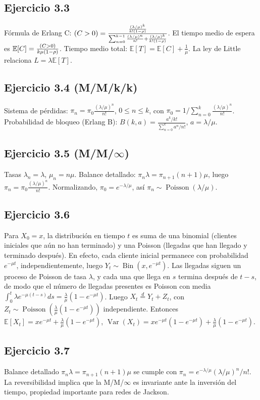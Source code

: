 \documentclass[12pt]{article}
\let\P\relax
\newcommand{\P}{\mathbb{P}}
\newcommand{\E}{\mathbb{E}}
\newcommand{\1}{\mathbf{1}}
\newcommand{\Var}{\operatorname{Var}}
\newcommand{\Bin}{\operatorname{Bin}}
\newcommand{\Poisson}{\operatorname{Poisson}}
\begin{document}
\subsection{Ejercicio 3.3}
F\'ormula de Erlang C: $\P(C>0)=\frac{\frac{(\lambda/\mu)^k}{k!(1-\rho)}}{\sum_{n=0}^{k-1}\frac{(\lambda/\mu)^n}{n!}+\frac{(\lambda/\mu)^k}{k!(1-\rho)}}$. El tiempo medio de espera es $\E[C]=\frac{\P(C>0)}{k\mu(1-\rho)}$. Tiempo medio total: $\E[T]=\E[C]+\frac1\mu$. La ley de Little relaciona $L=\lambda\E[T]$.

\subsection{Ejercicio 3.4 (M/M/k/k)}
Sistema de p\'erdidas: $\pi_n=\pi_0\frac{(\lambda/\mu)^n}{n!}$, $0\le n\le k$, con $\pi_0=1/\sum_{n=0}^k\frac{(\lambda/\mu)^n}{n!}$. Probabilidad de bloqueo (Erlang B): $B(k,a)=\frac{a^k/k!}{\sum_{n=0}^k a^n/n!}$, $a=\lambda/\mu$.

\subsection{Ejercicio 3.5 (M/M/$\infty$)}
Tasas $\lambda_n=\lambda$, $\mu_n=n\mu$. Balance detallado: $\pi_n\lambda=\pi_{n+1}(n+1)\mu$, luego $\pi_n=\pi_0\frac{(\lambda/\mu)^n}{n!}$. Normalizando, $\pi_0=e^{-\lambda/\mu}$, as\'i $\pi_n\sim\Poisson(\lambda/\mu)$.

\subsection{Ejercicio 3.6}
Para $X_0=x$, la distribuci\'on en tiempo $t$ es suma de una binomial (clientes iniciales que a\'un no han terminado) y una Poisson (llegadas que han llegado y terminado despu\'es). En efecto, cada cliente inicial permanece con probabilidad $e^{-\mu t}$, independientemente, luego $Y_t\sim\Bin(x,e^{-\mu t})$. Las llegadas siguen un proceso de Poisson de tasa $\lambda$, y cada una que llega en $s$ termina despu\'es de $t-s$, de modo que el n\'umero de llegadas presentes es Poisson con media $\int_0^t\lambda e^{-\mu(t-s)}ds=\frac{\lambda}{\mu}(1-e^{-\mu t})$. Luego $X_t\stackrel{d}{=}Y_t+Z_t$, con $Z_t\sim\Poisson(\frac{\lambda}{\mu}(1-e^{-\mu t}))$ independiente. Entonces $\E[X_t]=xe^{-\mu t}+\frac{\lambda}{\mu}(1-e^{-\mu t})$, $\Var(X_t)=xe^{-\mu t}(1-e^{-\mu t})+\frac{\lambda}{\mu}(1-e^{-\mu t})$.

\subsection{Ejercicio 3.7}
Balance detallado $\pi_n\lambda=\pi_{n+1}(n+1)\mu$ se cumple con $\pi_n=e^{-\lambda/\mu}(\lambda/\mu)^n/n!$. La reversibilidad implica que la M/M/$\infty$ es invariante ante la inversi\'on del tiempo, propiedad importante para redes de Jackson.
\end{document}
